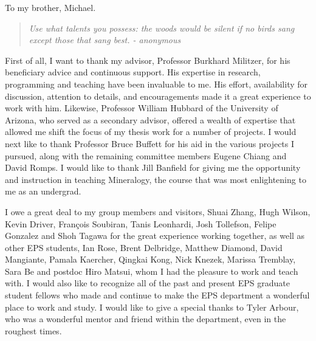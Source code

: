 \documentclass[phd,12pt]{ucbthesis}
\begin{document}
\begin{frontmatter}

\begin{dedication}
\null\vfil
\begin{center}
To my brother, Michael.\\\vspace{12pt}

\begin{quote}
    \textit{Use what talents you possess: the woods would be silent if no
birds sang except those that sang best. - anonymous
}
\end{quote}
\end{center}
\vfil\null
\end{dedication}


\tableofcontents
\clearpage
\listoffigures
\clearpage
\listoftables

\begin{acknowledgements}
First of all, I want to thank my advisor, Professor Burkhard Militzer, for his
beneficiary advice and continuous support. His expertise in research, programming and
teaching have been invaluable to me. His effort, availability for discussion,
attention to details, and encouragements made it a great experience to work with him.
Likewise, Professor William Hubbard of the University of Arizona, who served as a
secondary advisor, offered a wealth of expertise that allowed me shift the focus of
my thesis work for a number of projects. I would next like to thank Professor Bruce
Buffett for his aid in the various projects I pursued, along with the remaining
committee members Eugene Chiang and David Romps.  I would like to thank Jill Banfield
for giving me the opportunity and instruction in teaching Mineralogy, the course that
was most enlightening to me as an undergrad.

I owe a great deal to my group members and visitors, Shuai Zhang, Hugh Wilson, Kevin
Driver, Fran\c{c}ois Soubiran, Tanis Leonhardi, Josh Tollefson, Felipe Gonzalez and
Shoh Tagawa for the great experience working together, as well as other EPS students,
Ian Rose, Brent Delbridge, Matthew Diamond, David Mangiante, Pamala Kaercher, Qingkai
Kong, Nick Knezek, Marissa Tremblay, Sara Be and postdoc Hiro Matsui, whom I had the
pleasure to work and teach with.
I would also like to recognize all of the past and present EPS graduate student fellows who made
and continue to make the EPS department a wonderful place to work and study.
I would like to give a special thanks to Tyler Arbour, who was a wonderful mentor and
friend within the department, even in the roughest times.


\end{acknowledgements}
\end{frontmatter}
\end{document}
